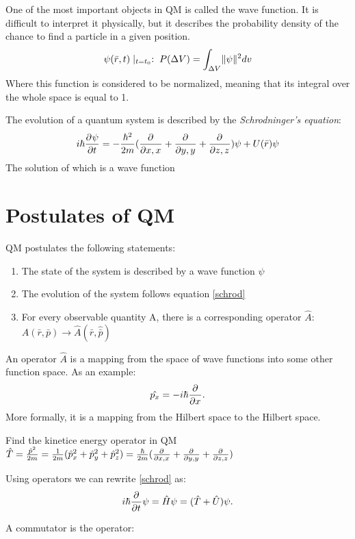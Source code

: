 {
    One of the most important objects in QM is called the wave function. It is difficult to interpret it physically, but it describes the probability density of the chance to find a particle in a given position.
    \begin{equation}
        \psi (\bar{r},t)\mid_{t=t_0}:\; P(\Delta V) = \int_{\Delta V} \lVert\psi\rVert^{2}dv
    \end{equation}
    Where this function is considered to be normalized, meaning that its integral over the whole space is equal to 1.

}

{
    The evolution of a quantum system is described by the \textit{Schrodninger's equation}:
    \begin{equation}
        \label{schrod}
        i\hbar \frac{\partial^{}\psi }{\partial t^{}} = -\frac{\hbar^{2}}{2m}( \frac{\partial^{}}{\partial x,x^{}} + \frac{\partial^{}}{\partial y,y^{}} +\frac{\partial^{}}{\partial z,z^{}})\psi  + U(\bar{r})\psi 
    \end{equation}
    The solution of which is a wave function
}
\clearpage
\section{Postulates of QM}
QM postulates the following statements:
\begin{enumerate}
    \item The state of the system is described by a wave function $\psi $
    \item The evolution of the system follows equation \ref{schrod}
    \item For every observable quantity A, there is a corresponding operator $\hat{A}$:  $A(\bar{r},\bar{p}) \longrightarrow \hat{A}(\hat{\bar{r}},\hat{\bar{p}})$
\end{enumerate}
{
    An operator $\hat{A}$ is a mapping from the space of wave functions into some other function space. As an example:
    \[
        \hat{p_x} = -i\hbar\frac{\partial^{}}{\partial x^{}}
    .\]         
    More formally, it is a mapping from the Hilbert space to the Hilbert space.
}

\qs{}
{
    Find the kinetice energy operator in QM
}
\sol $\hat{T} = \frac{\hat{p}^{2}}{2m} = \frac{1}{2m}(\hat{p}_x^{2} + \hat{p}_y^{2} + \hat{p}_z^{2}) = \frac{ \hbar}{2m}( \frac{\partial^{}}{\partial x,x^{}} + \frac{\partial^{}}{\partial y,y^{}} + \frac{\partial^{}}{\partial z,z^{}}) $ 

\nt
{
    Using operators we can rewrite \ref{schrod} as:
    \[
    i\hbar \frac{\partial^{}}{\partial t^{}}\psi = \hat{H}\psi = (\hat{T}+\hat{U})\psi 
    .\] 
}

{
    A commutator is the operator: 
}



